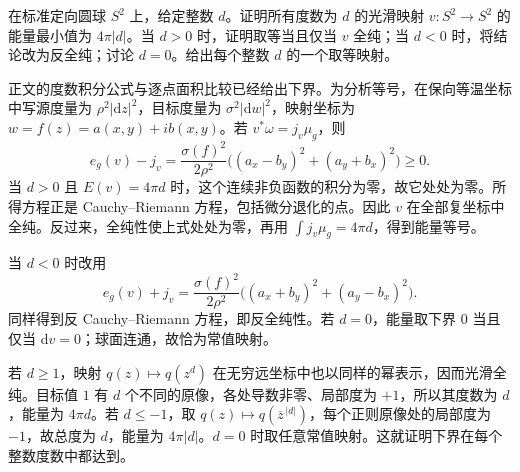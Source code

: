 \begin{exercise}\label{g3:ex:sphere-degree-energy-equality}
	在标准定向圆球 \(S^2\) 上，给定整数 \(d\)。证明所有度数为 \(d\) 的光滑映射 \(v:S^2\to S^2\) 的能量最小值为 \(4\pi|d|\)。当 \(d>0\) 时，证明取等当且仅当 \(v\) 全纯；当 \(d<0\) 时，将结论改为反全纯；讨论 \(d=0\)。给出每个整数 \(d\) 的一个取等映射。
\end{exercise}
\begin{solution}
	正文的度数积分公式与逐点面积比较已经给出下界。为分析等号，在保向等温坐标中写源度量为 \(\rho^2|\mathrm dz|^2\)，目标度量为
	\(\sigma^2|\mathrm dw|^2\)，映射坐标为 \(w=f(z)=a(x,y)+ib(x,y)\)。若
	\(v^*\omega=j_v\mu_g\)，则
	\[
		e_g(v)-j_v
		=\frac{\sigma(f)^2}{2\rho^2}
		\bigl((a_x-b_y)^2+(a_y+b_x)^2\bigr)\ge0.
	\]
	当 \(d>0\) 且 \(E(v)=4\pi d\) 时，这个连续非负函数的积分为零，故它处处为零。所得方程正是 Cauchy--Riemann 方程，包括微分退化的点。因此 \(v\) 在全部复坐标中全纯。反过来，全纯性使上式处处为零，再用
	\(\int j_v\mu_g=4\pi d\)，得到能量等号。

	当 \(d<0\) 时改用
	\[
		e_g(v)+j_v
		=\frac{\sigma(f)^2}{2\rho^2}
		\bigl((a_x+b_y)^2+(a_y-b_x)^2\bigr).
	\]
	同样得到反 Cauchy--Riemann 方程，即反全纯性。若 \(d=0\)，能量取下界 \(0\) 当且仅当 \(\mathrm dv=0\)；球面连通，故恰为常值映射。

	若 \(d\ge1\)，映射 \(q(z)\mapsto q(z^d)\) 在无穷远坐标中也以同样的幂表示，因而光滑全纯。目标值 \(1\) 有 \(d\) 个不同的原像，各处导数非零、局部度为 \(+1\)，所以其度数为 \(d\)，能量为 \(4\pi d\)。若 \(d\le-1\)，取
	\(q(z)\mapsto q(\overline z^{\,|d|})\)，每个正则原像处的局部度为
	\(-1\)，故总度为 \(d\)，能量为 \(4\pi|d|\)。\(d=0\) 时取任意常值映射。这就证明下界在每个整数度数中都达到。
\end{solution}
